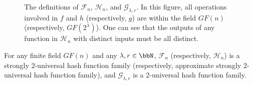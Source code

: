 %
%
%

\begin{figure}[htpb]
\begin{center}
\end{center} 
\caption{The definitions of $\mathcal F_n$, $\mathcal H_n$, and $\mathcal G_{\lambda,r}$. In this figure, all operations involved in $f$ and $h$ (respectively, $g$) are within the field $GF(n)$ (respectively, $GF(2^\lambda)$). One can see that the outputs of any function in $\mathcal H_n$ with distinct inputs must be all distinct.}
\label{fig:con-hash}
\end{figure}

\begin{lemma}
\label{lem:cm}
For any finite field $GF(n)$ and any $\lambda,r\in\N$, $\mathcal F_n$ (respectively, $\mathcal H_n$) is a strongly 2-universal hash function family (respectively, approximate strongly 2-universal hash function family), and $\mathcal G_{\lambda,r}$ is a 2-universal hash function family.
\end{lemma}



